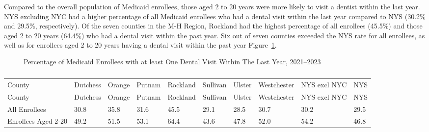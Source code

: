\documentclass[
  english,
  letterpaper,
]{report}
\begin{document}
Compared to the overall population of Medicaid enrollees, those aged 2
to 20 years were more likely to visit a dentist within the last year.
NYS excluding NYC had a higher percentage of all Medicaid enrollees who
had a dental visit within the last year compared to NYS (30.2\% and
29.5\%, respectively). Of the seven counties in the M-H Region, Rockland
had the highest percentage of all enrollees (45.5\%) and those aged 2 to
20 years (64.4\%) who had a dental visit within the past year. Six out
of seven counties exceeded the NYS rate for all enrollees, as well as
for enrollees aged 2 to 20 years having a dental visit within the past
year Figure~\ref{fig-medicaid-1dental-visit-percent}.

\begin{figure}


\caption{\label{fig-medicaid-1dental-visit-percent}Percentage of
Medicaid Enrollees with at least One Dental Visit Within The Last Year,
2021--2023}

\end{figure}%

\begin{longtable}[]{@{}llllllllll@{}}

\caption{\label{tbl-medicaid-1dental-visit-percent}Percentage of
Medicaid Enrollees with at least One Dental Visit Within The Last Year,
2021--2023}

\tabularnewline

\caption{}\label{T_118cb}\tabularnewline
\toprule\noalign{}
County & Dutchess & Orange & Putnam & Rockland & Sullivan & Ulster &
Westchester & NYS excl NYC & NYS \\
\midrule\noalign{}
\endfirsthead
\toprule\noalign{}
County & Dutchess & Orange & Putnam & Rockland & Sullivan & Ulster &
Westchester & NYS excl NYC & NYS \\
\midrule\noalign{}
\endhead
\bottomrule\noalign{}
\endlastfoot
All Enrollees & 30.8 & 35.8 & 31.6 & 45.5 & 29.1 & 28.5 & 30.7 & 30.2 &
29.5 \\
Enrollees Aged 2-20 & 49.2 & 51.5 & 53.1 & 64.4 & 43.6 & 47.8 & 52.0 &
54.2 & 46.8 \\

\end{longtable}
\end{document}
